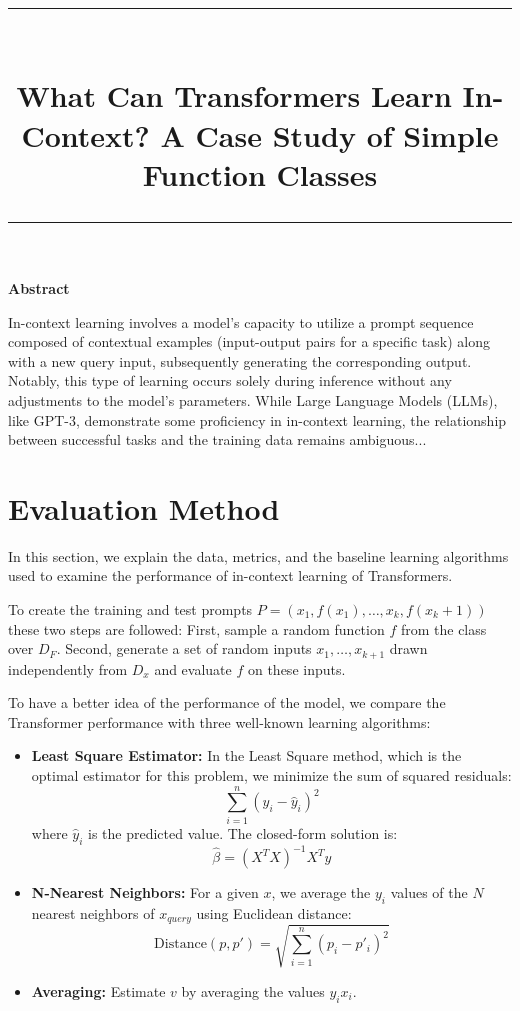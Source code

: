 \documentclass[11pt]{article}
\title{
\rule{\linewidth}{1pt} \\[0.4cm]
\textbf{\Large What Can Transformers Learn In-Context? A Case Study of Simple Function Classes} \\[0.4cm]
\rule{\linewidth}{1pt}
}
\author{}
\date{}
\begin{document}
\maketitle

\vspace{-2em}
\begin{center}
\textbf{Abstract}
\end{center}

\noindent
In-context learning involves a model’s capacity to utilize a prompt sequence composed of contextual examples (input-output pairs for a specific task) along with a new query input, subsequently generating the corresponding output. Notably, this type of learning occurs solely during inference without any adjustments to the model’s parameters. While Large Language Models (LLMs), like GPT-3, demonstrate some proficiency in in-context learning, the relationship between successful tasks and the training data remains ambiguous...


\section{Evaluation Method}

In this section, we explain the data, metrics, and the baseline learning algorithms used to examine the performance of in-context learning of Transformers.

To create the training and test prompts $P = (x_1, f(x_1), \ldots, x_k, f(x_k+1))$ these two steps are followed: First, sample a random function $f$ from the class over $D_F$. Second, generate a set of random inputs $x_1, \ldots, x_{k+1}$ drawn independently from $D_x$ and evaluate $f$ on these inputs.

\vspace{0.5em}
To have a better idea of the performance of the model, we compare the Transformer performance with three well-known learning algorithms:

\begin{itemize}[leftmargin=2em]
    \item \textbf{Least Square Estimator:} In the Least Square method, which is the optimal estimator for this problem, we minimize the sum of squared residuals:
    \[
    \sum_{i=1}^{n}(y_i - \hat{y}_i)^2
    \]
    where $\hat{y}_i$ is the predicted value. The closed-form solution is:
    \[
    \hat{\beta} = (X^TX)^{-1}X^Ty
    \]

    \item \textbf{N-Nearest Neighbors:} For a given $x$, we average the $y_i$ values of the $N$ nearest neighbors of $x_{query}$ using Euclidean distance:
    \[
    \text{Distance}(p, p') = \sqrt{\sum_{i=1}^n (p_i - p'_i)^2}
    \]

    \item \textbf{Averaging:} Estimate $v$ by averaging the values $y_i x_i$.
\end{itemize}
\end{document}
